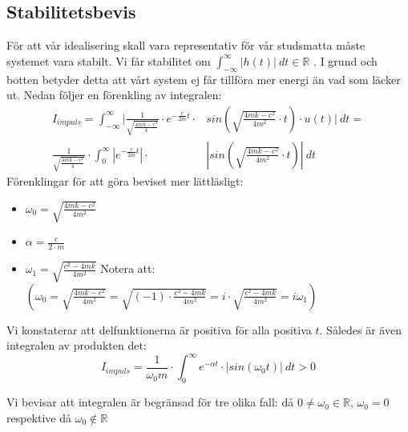 \documentclass[10pt,a4paper]{article}
\begin{document}
\newpage
\subsection{Stabilitetsbevis}
För att vår idealisering skall vara representativ för vår studsmatta måste systemet vara stabilt. Vi får stabilitet om $\int_{-\infty}^{\infty}|h(t)|\ dt\in \mathbb{R}$ \cite[s.~48]{sune2000}. I grund och botten betyder detta att vårt system ej får tillföra mer energi än vad som läcker ut. Nedan följer en förenkling av integralen:
\begin{equation}
\begin{split}
I_{impuls}=\int_{-\infty}^{\infty}| \frac{1}{\sqrt{\frac{4  m  k - c^2}{4}} }  \cdot e^{-\frac{c}{2m}  t} \cdot & sin(\sqrt{\frac{4  m  k - c^2}{4  m^2}} \cdot t) \cdot u(t)| \ dt=\\ \frac{1}{\sqrt{\frac{4  m  k - c^2}{4}} }  \cdot \int_{0}^{\infty}|e^{-\frac{c}{2m}  t}| \cdot & |sin(\sqrt{\frac{4  m  k - c^2}{4  m^2}} \cdot t)| \ dt
\end{split}
\end{equation}
Förenklingar för att göra beviset mer lättläsligt:
\begin{itemize}
\item $\omega_0=\sqrt{\frac{4  m  k - c^2}{4  m^2}}$
\item $\alpha=\frac{c}{2\cdot m}$
\item $\omega_1=\sqrt{\frac{c^2-4  m  k}{4  m^2}}$
\newline
\newline 
Notera att: $\left( \omega_0=\sqrt{\frac{4  m  k-c^2}{4  m^2}}=\sqrt{(-1)\cdot\frac{c^2-4  m  k}{4  m^2}}=i\cdot\sqrt{\frac{c^2-4  m  k}{4  m^2}}=i \omega_1\right)$
\end{itemize}

Vi konstaterar att delfunktionerna är positiva för alla positiva $t$. Således är även integralen av produkten det:
$$I_{impuls}=\frac{1}{\omega_0  m} \cdot \int_{0}^{\infty}e^{-\alpha t}\cdot | sin(\omega_0 t)| \ dt>0$$

Vi bevisar att integralen är begränsad för tre olika fall: då $0\neq\omega_0 \in \mathbb{R}$, $\omega_0=0$ respektive då $\omega_0 \notin \mathbb{R}$
\end{document}
